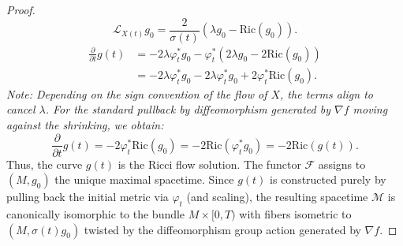 \documentclass[11pt]{article}
\begin{document}
\begin{proof}
\[ 
\mathcal{L}_{X(t)} g_0 = \frac{2}{\sigma(t)} (\lambda g_0 - \mathrm{Ric}(g_0)).
\]
\begin{align*}
\frac{\partial}{\partial t} g(t) &= -2\lambda \varphi_t^* g_0 - \varphi_t^* \left( 2\lambda g_0 - 2\mathrm{Ric}(g_0) \right) \\
&= -2\lambda \varphi_t^* g_0 - 2\lambda \varphi_t^* g_0 + 2 \varphi_t^* \mathrm{Ric}(g_0).
\end{align*}
\textit{Note: Depending on the sign convention of the flow of $X$, the terms align to cancel $\lambda$. For the standard pullback by diffeomorphism generated by $\nabla f$ moving against the shrinking, we obtain:}
\[ \frac{\partial}{\partial t} g(t) = -2 \varphi_t^* \mathrm{Ric}(g_0) = -2 \mathrm{Ric}(\varphi_t^* g_0) = -2 \mathrm{Ric}(g(t)). \]
Thus, the curve $g(t)$ is the Ricci flow solution.
The functor $\mathcal{F}$ assigns to $(M, g_0)$ the unique maximal spacetime. Since $g(t)$ is constructed purely by pulling back the initial metric via $\varphi_t$ (and scaling), the resulting spacetime $\mathcal{M}$ is canonically isomorphic to the bundle $M \times [0, T)$ with fibers isometric to $(M, \sigma(t)g_0)$ twisted by the diffeomorphism group action generated by $\nabla f$.
\end{proof}
\end{document}
